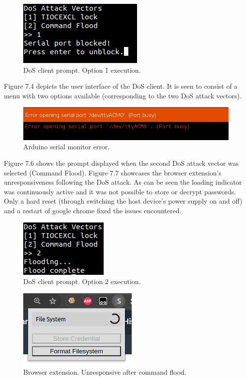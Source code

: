 \begin{figure}[H]
\centering
\includegraphics[width=0.35\columnwidth]{Figures/Fig_32.png}
\caption{DoS client prompt. Option 1 execution.}
\label{fig:gantt}
\end{figure}

Figure 7.4 depicts the user interface of the DoS client. It is seen to consist of a menu with two options available (corresponding to the two DoS attack vectors).
\begin{figure}[H]
\centering
\includegraphics[width=0.9\columnwidth]{Figures/Fig_31.png}
\caption{Arduino serial monitor error.}
\label{fig:gantt}
\end{figure}

Figure 7.6 shows the prompt displayed when the second DoS attack vector was selected (Command Flood). Figure 7.7 showcases the browser extension's unresponsiveness following the DoS attack. As can be seen the loading indicator was continuously active and it was not possible to store or decrypt passwords. Only a hard reset (through switching the host device's power supply on and off) and a restart of google chrome fixed the issues encountered.  
\begin{figure}[H]
\centering
\includegraphics[width=0.25\columnwidth]{Figures/Fig_33.png}
\caption{DoS client prompt. Option 2 execution.}
\label{fig:gantt}
\end{figure}


\begin{figure}[H]
\centering
\includegraphics[width=0.3\columnwidth]{Figures/Fig_88.png}
\caption{Browser extension. Unresponsive after command flood.}
\label{fig:gantt}
\end{figure}

